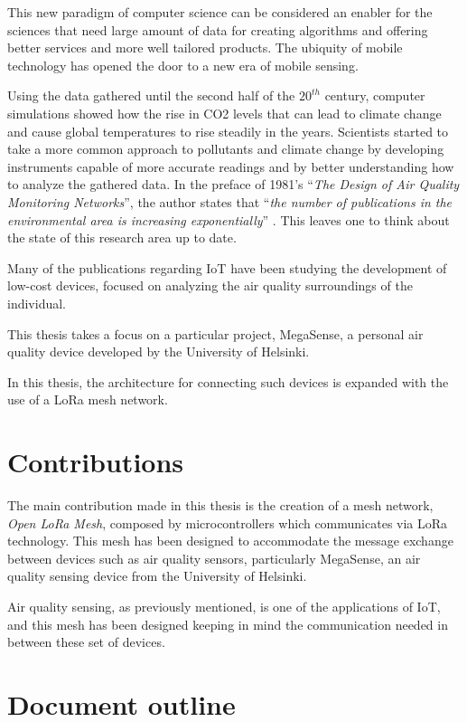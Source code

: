 	This new paradigm of computer science can be considered an enabler for the sciences that need large amount of data for creating algorithms and offering better services and more well tailored products.
	The ubiquity of mobile technology has opened the door to a new era of mobile sensing. 
	
	Using the data gathered until the second half of the $20^{th}$ century, computer simulations showed how the rise in CO2 levels that can lead to climate change and cause global temperatures to rise steadily in the years.
	Scientists started to take a more common approach to pollutants and climate change by developing instruments capable of more accurate readings and by better understanding how to analyze the gathered data.
	In the preface of 1981's ``\textit{The Design of Air Quality Monitoring Networks}'', the author states that ``\textit{the number of publications in the environmental area is increasing exponentially}'' \cite{airqualitynetworks}.
	This leaves one to think about the state of this research area up to date.

	Many of the publications regarding IoT have been studying the development of low-cost devices, focused on analyzing the air quality surroundings of the individual. 
	
	This thesis takes a focus on a particular project, MegaSense, a personal air quality device developed by the University of Helsinki.
	
	In this thesis, the architecture for connecting such devices is expanded with the use of a LoRa mesh network.
	
	\section{Contributions}\label{sec:contributions}
	
		The main contribution made in this thesis is the creation of a mesh network, \textit{Open LoRa Mesh}, composed by microcontrollers which communicates via LoRa technology.
		This mesh has been designed to accommodate the message exchange between devices such as air quality sensors, particularly MegaSense, an air quality sensing device from the University of Helsinki.
		
		Air quality sensing, as previously mentioned, is one of the applications of IoT, and this mesh has been designed keeping in mind the communication needed in between these set of devices.
		
	\section{Document outline}\label{sec:document_outline}
		
